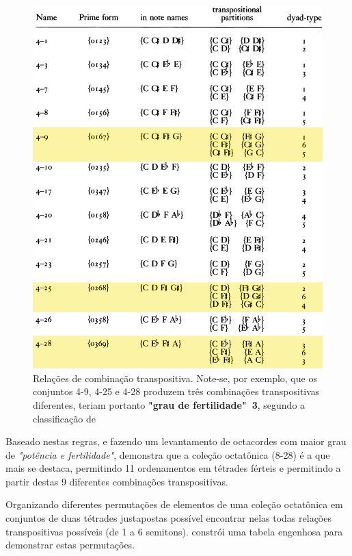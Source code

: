 \documentclass[
	12pt,				%
	openright,			%
	twoside,			%
	a4paper,			%
	english,			%
	french,				%
	spanish,			%
	brazil				%
	]{abntex2}
\begin{document}
\begin{figure}[!h]
	\caption{\label{fig_grafico} Relações de combinação transpositiva. Note-se, por exemplo, que os conjuntos 4-9, 4-25 e 4-28 produzem três combinações transpositivas diferentes, teriam portanto \textbf{"grau de fertilidade"\ 3}, segundo a classificação de   }
	\begin{center}
	    \includegraphics[scale=0.35]{octa/trasposiCohn.png}
	\end{center}
\end{figure}


Baseado nestas regras, e fazendo um levantamento de octacordes com maior grau de \textit{"potência e fertilidade"},  demonstra que a coleção octatônica (8-28) é a que mais se destaca, permitindo 11 ordenamentos em tétrades férteis e permitindo a partir destas 9 diferentes combinações transpositivas.


Organizando diferentes permutações de elementos de uma coleção octatônica em conjuntos de duas tétrades justapostas possível encontrar nelas todas relações transpositivas possíveis (de 1 a 6 semitons).  constrói uma tabela engenhosa para demonstrar estas permutações. 
\end{document}
